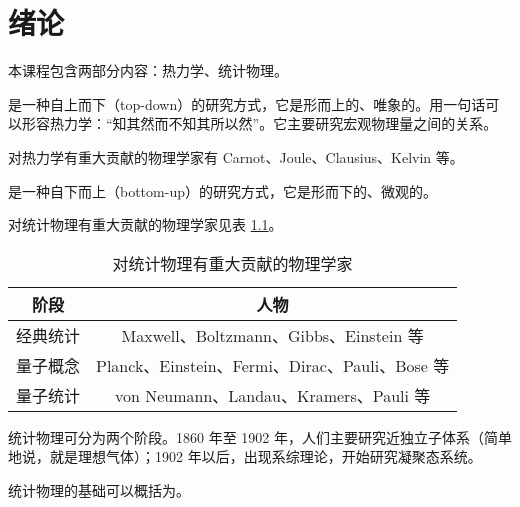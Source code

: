 \chapter{绪论}

本课程包含两部分内容：热力学、统计物理。

是一种自上而下（top-down）的研究方式，它是形而上的、唯象的。用一句话可
以形容热力学：“知其然而不知其所以然”。它主要研究宏观物理量之间的关系。

对热力学有重大贡献的物理学家有 Carnot、Joule、Clausius、Kelvin 等。

\blankline

是一种自下而上（bottom-up）的研究方式，它是形而下的、微观的。

对统计物理有重大贡献的物理学家见表 \ref{tab:physicist-in-statistical-physics}。

\begin{table}[h]
  \centering
  \caption{对统计物理有重大贡献的物理学家}
  \label{tab:physicist-in-statistical-physics}
  \begin{tabular}{cc}
    \toprule
      \textbf{阶段} & \textbf{人物} \\
    \midrule
      经典统计 & Maxwell、Boltzmann、Gibbs、Einstein 等 \\
      量子概念 & Planck、Einstein、Fermi、Dirac、Pauli、Bose 等 \\
      量子统计 & von Neumann、Landau、Kramers、Pauli 等 \\
    \bottomrule
  \end{tabular}
\end{table}

统计物理可分为两个阶段。1860 年至 1902 年，人们主要研究近独立子体系（简单地说，就是理想气体）；1902
年以后，出现系综理论，开始研究凝聚态系统。

统计物理的基础可以概括为。
